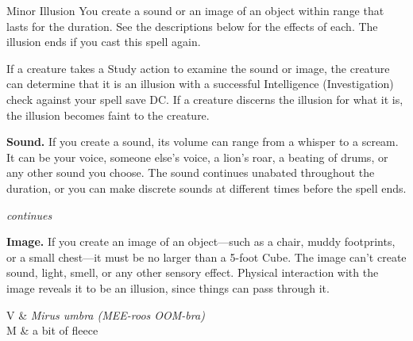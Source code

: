 \begin{Spell}[
    level=Cantrip,
    time=1 Action,
    range=30 ft/5 ft cube,
    components={S, M},
    duration=1 Minute,
    school=Illusion,
    attack=None,
    effect=Control
]{Minor Illusion}
You create a sound or an image of an object within range that lasts for the duration. See the descriptions below for the effects of each. The illusion ends if you cast this spell again.

If a creature takes a Study action to examine the sound or image, the creature can determine that it is an illusion with a successful Intelligence (Investigation) check against your spell save DC. If a creature discerns the illusion for what it is, the illusion becomes faint to the creature.

\textbf{Sound.} If you create a sound, its volume can range from a whisper to a scream. It can be your voice, someone else's voice, a lion's roar, a beating of drums, or any other sound you choose. The sound continues unabated throughout the duration, or you can make discrete sounds at different times before the spell ends.

\vfill \hfill \textit{\footnotesize continues}
\newpage
{}

\textbf{Image.} If you create an image of an object---such as a chair, muddy footprints, or a small chest---it must be no larger than a 5-foot Cube. The image can't create sound, light, smell, or any other sensory effect. Physical interaction with the image reveals it to be an illusion, since things can pass through it.

\begin{components}
V & \textit{Mirus umbra (MEE-roos OOM-bra)} \\
M & a bit of fleece
\end{components}
\end{Spell}


